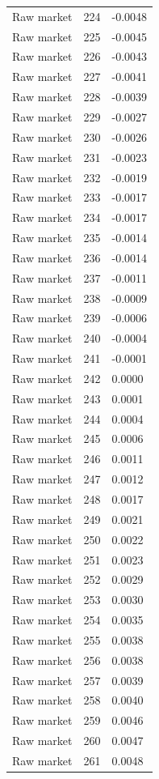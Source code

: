 \begin{table}[htbp]
\begin{tabular}{lll}
Raw market & 224 & -0.0048 \\
Raw market & 225 & -0.0045 \\
Raw market & 226 & -0.0043 \\
Raw market & 227 & -0.0041 \\
Raw market & 228 & -0.0039 \\
Raw market & 229 & -0.0027 \\
Raw market & 230 & -0.0026 \\
Raw market & 231 & -0.0023 \\
Raw market & 232 & -0.0019 \\
Raw market & 233 & -0.0017 \\
Raw market & 234 & -0.0017 \\
Raw market & 235 & -0.0014 \\
Raw market & 236 & -0.0014 \\
Raw market & 237 & -0.0011 \\
Raw market & 238 & -0.0009 \\
Raw market & 239 & -0.0006 \\
Raw market & 240 & -0.0004 \\
Raw market & 241 & -0.0001 \\
Raw market & 242 & 0.0000 \\
Raw market & 243 & 0.0001 \\
Raw market & 244 & 0.0004 \\
Raw market & 245 & 0.0006 \\
Raw market & 246 & 0.0011 \\
Raw market & 247 & 0.0012 \\
Raw market & 248 & 0.0017 \\
Raw market & 249 & 0.0021 \\
Raw market & 250 & 0.0022 \\
Raw market & 251 & 0.0023 \\
Raw market & 252 & 0.0029 \\
Raw market & 253 & 0.0030 \\
Raw market & 254 & 0.0035 \\
Raw market & 255 & 0.0038 \\
Raw market & 256 & 0.0038 \\
Raw market & 257 & 0.0039 \\
Raw market & 258 & 0.0040 \\
Raw market & 259 & 0.0046 \\
Raw market & 260 & 0.0047 \\
Raw market & 261 & 0.0048 \\

\end{tabular}
\end{table}
